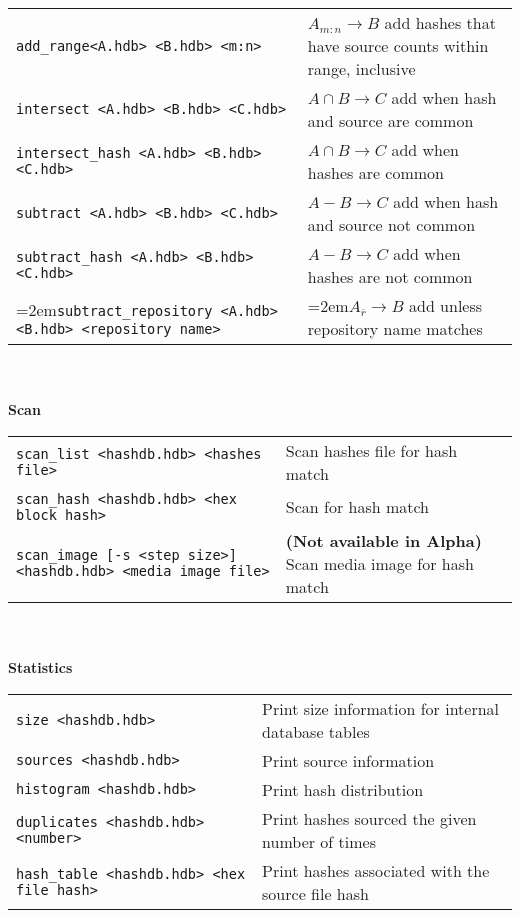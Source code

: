 \begin{footnotesize}
\begin{tabular}{p{3.6 in} p{3.0 in}}
\texttt{add\_range<A.hdb> <B.hdb> <m:n>} & $A_{m:n} \rightarrow B$ add hashes that have source counts within range, inclusive\\
\texttt{intersect <A.hdb> <B.hdb> <C.hdb>} & $A \cap B \rightarrow C$ add when hash and source are common\\
\texttt{intersect\_hash <A.hdb> <B.hdb> <C.hdb>} & $A \cap B \rightarrow C$ add when hashes are common\\
\texttt{subtract <A.hdb> <B.hdb> <C.hdb>} & $A - B \rightarrow C$ add when hash and source not common\\
\texttt{subtract\_hash <A.hdb> <B.hdb> <C.hdb>} & $A - B \rightarrow C$ add when hashes are not common\\
\hangindent=2em\texttt{subtract\_repository <A.hdb> <B.hdb> <repository name>} & \hangindent=2em$A_{\overline{r}} \rightarrow B$ add unless repository name matches\\
\end{tabular}
\\
\\
\textbf{Scan} \\
\begin{tabular}{p{3.6 in} p{3.0 in}}
\texttt{scan\_list <hashdb.hdb> <hashes file>} & Scan hashes file for hash match \\
\texttt{scan\_hash <hashdb.hdb> <hex block hash>} & Scan for hash match \\
\texttt{scan\_image [-s <step size>] <hashdb.hdb> <media image file>} & \textbf{(Not available in Alpha)} Scan media image for hash match \\
\end{tabular}
\\
\\
\textbf{Statistics}\\
\begin{tabular}{p{3.6 in} p{3.0 in}}
\texttt{size <hashdb.hdb>} & Print size information for internal database tables \\
\texttt{sources <hashdb.hdb>} & Print source information \\
\texttt{histogram <hashdb.hdb>} & Print hash distribution \\
\texttt{duplicates <hashdb.hdb> <number>} & Print hashes sourced the given number of times \\
\texttt{hash\_table <hashdb.hdb> <hex file hash>} & Print hashes associated with the source file hash\\
\end{tabular}
\\

\end{footnotesize}
